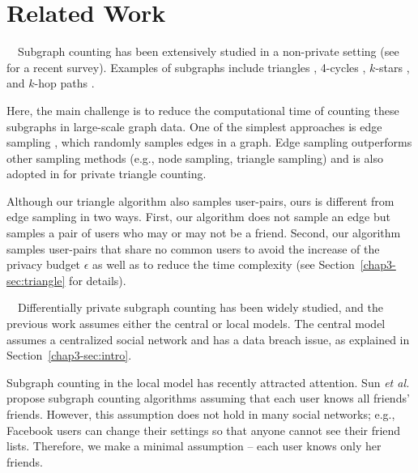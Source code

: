 \section{Related Work}
\label{chap3-sec:related}
{}~~Subgraph counting has been extensively studied in a non-private setting (see \cite{Ribeiro_CS21} for a recent survey). 
Examples of subgraphs include triangles \cite{Bera_PODS20,Eden_FOCS15,Kolountzakis_IM12,Wu_TKDE16},  4-cycles \cite{Bera_STACS17,Kallaugher_PODS19,Manjunath_ESA11,McGregor_PODS20}, $k$-stars \cite{Aliakbarpour_Alg18,Gonen_DM11}, and 
$k$-hop paths \cite{Bjorklund_ICALP19,Kartun-Giles_TWC18}. 

Here, the main challenge is to reduce the computational time of counting these subgraphs in large-scale graph data. 
One of the simplest approaches is edge sampling \cite{Bera_PODS20,Eden_FOCS15,Wu_TKDE16}, which randomly 
samples edges in a graph. 
Edge sampling outperforms other sampling methods 
(e.g., node sampling, triangle sampling) \cite{Wu_TKDE16} and is also adopted in \cite{Imola_USENIX22} 
for private triangle counting. 

Although our triangle algorithm also samples user-pairs, ours is different from edge sampling in two ways. 
First, our algorithm does not sample an edge but samples a pair of users who may or may not be a friend. 
Second, our algorithm samples user-pairs that share no common users to avoid the increase of the privacy budget $\epsilon$ as well as to reduce the time complexity 
(see Section~\ref{chap3-sec:triangle} for details). 

\smallskip
{}~~Differentially private subgraph counting has been widely studied, and the previous work assumes either the central \cite{Ding_TKDE21,Karwa_PVLDB11,Kasiviswanathan_TCC13} or local \cite{Imola_USENIX21,Imola_USENIX22,Sun_CCS19,Ye_ICDE20,Ye_TKDE21} models. 
The central model assumes a centralized social network and has a data breach issue, as explained in Section~\ref{chap3-sec:intro}. 

Subgraph counting in the local model has recently attracted attention. 
Sun \textit{et al.} \cite{Sun_CCS19} propose subgraph counting algorithms 
assuming 
that each user knows all friends' friends. 
However, this assumption does not hold in many social networks; e.g., Facebook users can change their settings so that anyone cannot see their friend lists. 
Therefore, we make a minimal assumption -- each user knows only her friends. 

